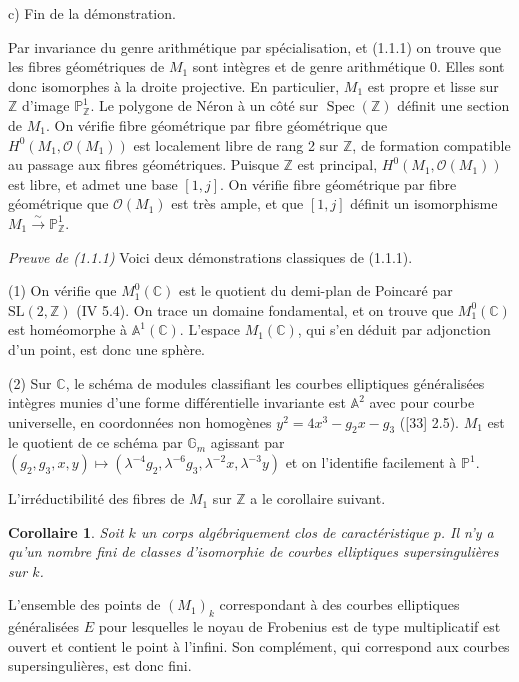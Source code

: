 \documentclass[10pt,a4paper]{amsart}
\theoremstyle{plain}
\newtheorem{corollary}[theorem]{Corollaire}
\theoremstyle{definition}
\DeclareMathOperator{\Spec}{Spec}
\newcommand{\ZZ}{\mathbb{Z}}
\newcommand{\GG}{\mathbb{G}}
\newcommand{\CC}{\mathbb{C}}
\newcommand{\SL}{\mathrm{SL}}
\begin{document}
c) Fin de la d\'emonstration.

Par invariance du genre arithm\'etique par sp\'ecialisation, et (1.1.1) on trouve que les fibres g\'eom\'etriques de $M_1$ sont int\`egres et de genre arithm\'etique 0. Elles sont donc isomorphes \`a la droite projective. En particulier, $M_1$ est propre et lisse sur $\ZZ$ d'image $\mathbb{P}^1_\ZZ$. Le polygone de N\'eron \`a un c\^ot\'e sur $\Spec(\ZZ)$ d\'efinit une section de $M_1$. On v\'erifie fibre g\'eom\'etrique par fibre g\'eom\'etrique que $H^0(M_1, \mathcal{O}(M_1))$ est localement libre de rang 2 sur $\ZZ$, de formation compatible au passage aux fibres g\'eom\'etriques. Puisque $\ZZ$ est principal, $H^0(M_1, \mathcal{O}(M_1))$ est libre, et admet une base $[1, j]$. On v\'erifie fibre g\'eom\'etrique par fibre g\'eom\'etrique que $\mathcal{O}(M_1)$ est tr\`es ample, et que $[1,j]$ d\'efinit un isomorphisme $M_1 \xrightarrow{\sim} \mathbb{P}^1_\ZZ$.

\smallskip\noindent\emph{Preuve de (1.1.1)} Voici deux d\'emonstrations classiques de (1.1.1).

(1) On v\'erifie que $M_1^0(\CC)$ est le quotient du demi-plan de Poincar\'e par $\SL(2,\ZZ)$ (IV 5.4). On trace un domaine fondamental, et on trouve que $M_1^0(\CC)$ est hom\'eomorphe \`a $\mathbb{A}^1(\CC)$. L'espace $M_1(\CC)$, qui s'en d\'eduit par adjonction d'un point, est donc une sph\`ere.

(2) Sur $\CC$, le sch\'ema de modules classifiant les courbes elliptiques g\'en\'eralis\'ees int\`egres munies d'une forme diff\'erentielle invariante est $\mathbb{A}^2$ avec pour courbe universelle, en coordonn\'ees non homog\`enes $y^2 = 4x^3 - g_2 x - g_3$ ([33] 2.5). $M_1$ est le quotient de ce sch\'ema par $\GG_m$ agissant par $(g_2, g_3, x, y) \mapsto (\lambda^{-4}g_2, \lambda^{-6}g_3, \lambda^{-2}x, \lambda^{-3}y)$ et on l'identifie facilement \`a $\mathbb{P}^1$.

L'irr\'eductibilit\'e des fibres de $M_1$ sur $\ZZ$ a le corollaire suivant.

\setcounter{theorem}{1}
\begin{corollary}
Soit $k$ un corps alg\'ebriquement clos de caract\'eristique $p$. Il n'y a qu'un nombre fini de classes d'isomorphie de courbes elliptiques supersinguli\`eres sur $k$.
\end{corollary}

L'ensemble des points de $(M_1)_k$ correspondant \`a des courbes elliptiques g\'en\'eralis\'ees $E$ pour lesquelles le noyau de Frobenius est de type multiplicatif est ouvert et contient le point \`a l'infini. Son compl\'ement, qui correspond aux courbes supersinguli\`eres, est donc fini.
\end{document}
